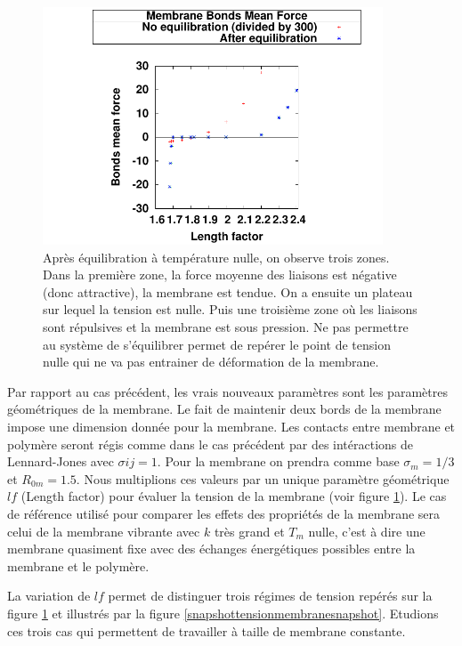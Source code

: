 \begin{figure}[H]
\begin{center}
\includegraphics[width=0.9\textwidth]{membranetensionplot.pdf}
\caption[Tension de la membrane]{Après équilibration à température nulle, on observe trois zones. Dans la première zone, la force moyenne des liaisons est négative (donc attractive), la membrane est tendue. On a ensuite un plateau sur lequel la tension est nulle. Puis une troisième zone où les liaisons sont répulsives et la membrane est sous pression. Ne pas permettre au système de s'équilibrer permet de repérer le point de tension nulle qui ne va pas entrainer de déformation de la membrane.}

\label{tensionmembrane}
\end{center}
\end{figure}

Par rapport au cas précédent, les vrais nouveaux paramètres sont les paramètres géométriques de la membrane. Le fait de maintenir deux bords de la membrane impose une dimension donnée pour la membrane.
Les contacts entre membrane et polymère seront régis comme dans le cas précédent par des intéractions de Lennard-Jones avec $\sigma{ij}=1$. Pour la membrane on prendra comme base $\sigma_m= 1/3$ et $R_{0m}=1.5$. Nous multiplions ces valeurs par un unique paramètre géométrique $lf$ (Length factor) pour évaluer la tension de la membrane (voir figure \ref{tensionmembrane}). Le cas de référence utilisé pour comparer les effets des propriétés de la membrane sera celui de la membrane vibrante avec $k$ très grand et $T_m$ nulle, c'est à dire une membrane quasiment fixe avec des échanges énergétiques possibles entre la membrane et le polymère.

La variation de $lf$ permet de distinguer trois régimes de tension repérés sur la figure \ref{tensionmembrane} et illustrés par la figure \ref{snapshottensionmembranesnapshot}. Etudions ces trois cas qui permettent de travailler à taille de membrane constante.

